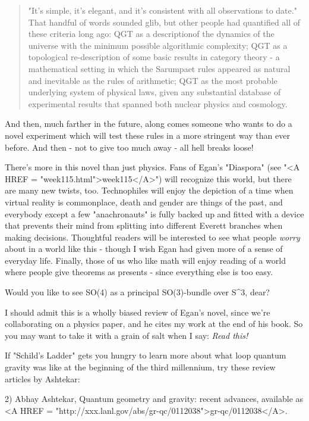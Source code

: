 \begin{quote}
    "It's simple, it's elegant, and it's consistent with all 
    observations to date."  That handful of words sounded glib, 
    but other people had quantified all of these criteria long ago: 
    QGT as a descriptionof the dynamics of the universe with the 
    minimum possible algorithmic complexity; QGT as a topological 
    re-description of some basic results in category theory - a 
    mathematical setting in which the Sarumpaet rules appeared as 
    natural and inevitable as the rules of arithmetic; QGT as the 
    most probable underlying system of physical laws, given any 
    substantial database of experimental results that spanned both
    nuclear physics and cosmology.
\end{quote}

And then, much farther in the future, along comes someone who wants to
do a novel experiment which will test these rules in a more stringent
way than ever before.  And then - not to give too much away - all hell
breaks loose!

There's more in this novel than just physics.  Fans of Egan's
"Diaspora" (see "<A HREF =
"week115.html">week115</A>") will recognize this world, but there
are many new twists, too.  Technophiles will enjoy the depiction of a
time when virtual reality is commonplace, death and gender are things of
the past, and everybody except a few "anachronauts" is fully
backed up and fitted with a device that prevents their mind from
splitting into different Everett branches when making decisions.
Thoughtful readers will be interested to see what people \emph{worry} about
in a world like this - though I wish Egan had given more of a sense of
everyday life.  Finally, those of us who like math will enjoy reading of
a world where people give theorems as presents - since everything else
is too easy.  

Would you like to see SO(4) as a principal SO(3)-bundle
over S^{3}, dear?

I should admit this is a wholly biased review of Egan's novel, since 
we're collaborating on a physics paper, and he cites my work at the 
end of his book.  So you may want to take it with a grain of salt 
when I say: \emph{Read this!}  

If "Schild's Ladder" gets you hungry to learn more about what loop
quantum gravity was like at the beginning of the third millennium, 
try these review articles by Ashtekar:

2) Abhay Ashtekar, Quantum geometry and gravity: recent advances,
available as <A HREF = "http://xxx.lanl.gov/abs/gr-qc/0112038">gr-qc/0112038</A>.


